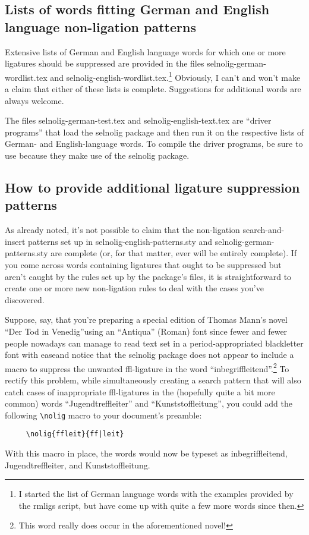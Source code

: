 \documentclass[12pt]{article}
\newcommand{\pkg}[1]{\textsf{#1}}
\begin{document}
\subsection{Lists of words fitting German and English language non-ligation patterns}

Extensive lists of German and English language words for which one or more ligatures should be suppressed are provided in the files \pkg{selnolig-german-wordlist.tex} and \pkg{selnolig-english-wordlist.tex}.\footnote{I started the list of German language words with the examples provided by the \pkg{rmligs} script, but have come up with quite a few more words since then.} Obviously, I can't and won't make a claim that either of these lists is complete. Suggestions for additional words are always welcome.

The files \pkg{selnolig-german-test.tex} and \pkg{selnolig-english-text.tex} are \enquote{driver programs} that load the \pkg{selnolig} package and then run it on the respective lists of German- and English-language words. To compile the driver programs, be sure to use \LuaLaTeX because they make use of the \pkg{selnolig} package.


\subsection{How to provide additional ligature suppression patterns}

As already noted, it's not possible to claim that the non-ligation search-and-insert patterns set up in \pkg{selnolig-english-patterns.sty} and \pkg{selnolig-german-patterns.sty} are complete (or, for that matter, ever will be entirely complete). If you come across words containing ligatures that ought to be suppressed but aren't caught by the rules set up by the package's files, it is straightforward to create one or more new non-ligation rules to deal with the cases you've discovered.

Suppose, say, that you're preparing a special edition of Thomas Mann's novel \enquote{Der Tod in Venedig}\textemdash using an \enquote{Antiqua} (Roman) font since fewer and fewer people nowadays can manage to read text set in a period-appropriated {\blackletterfont blackletter} font with ease\textemdash and notice that the \pkg{selnolig} package does not appear to include a macro to suppress the unwanted ffl-ligature in the word \enquote{inbegri\mbox{ffl}eitend}.\footnote{This word really does occur in the aforementioned novel!} To rectify this problem, while simultaneously creating a search pattern that will also catch cases of inappropriate ffl-ligatures in the (hopefully quite a bit more common) words  \enquote{Jugendtre\mbox{ffl}eiter} and \enquote{Kunststo\mbox{ffl}eitung}, you could add the following \Verb+\nolig+ macro to your document's preamble:
\begin{Verbatim}
     \nolig{ffleit}{ff|leit}
\end{Verbatim}
With this macro in place, the words would now be typeset as inbegriffleitend, Jugendtreffleiter, and Kunststoffleitung.
\end{document}
